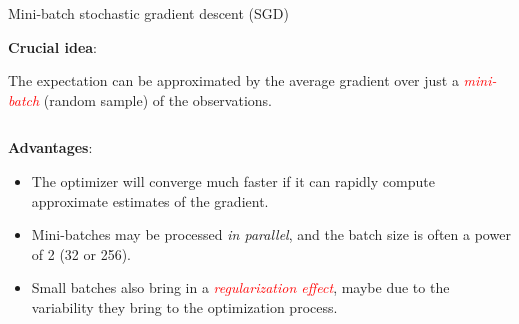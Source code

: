 \documentclass[
  10pt,
  ignorenonframetext,
]{beamer}
\providecommand{\tightlist}{%
  \setlength{\itemsep}{0pt}\setlength{\parskip}{0pt}}
\begin{document}
\begin{frame}
\begin{block}{Mini-batch stochastic gradient descent (SGD)}
\protect\hypertarget{mini-batch-stochastic-gradient-descent-sgd}{}
\(~\)

\textbf{Crucial idea}:

The expectation can be approximated by the average gradient over just a
\emph{\textcolor{red}{mini-batch}} (random sample) of the observations.

\(~\)

\textbf{Advantages}:

\vspace{1mm}

\begin{itemize}
\tightlist
\item
  The optimizer will converge much faster if it can rapidly compute
  approximate estimates of the gradient.
\end{itemize}

\vspace{1mm}

\begin{itemize}
\tightlist
\item
  Mini-batches may be processed \emph{in parallel}, and the batch size
  is often a power of 2 (32 or 256).
\end{itemize}

\vspace{1mm}

\begin{itemize}
\tightlist
\item
  Small batches also bring in a
  \emph{\textcolor{red}{regularization effect}}, maybe due to the
  variability they bring to the optimization process.
\end{itemize}
\end{block}
\end{frame}
\end{document}
